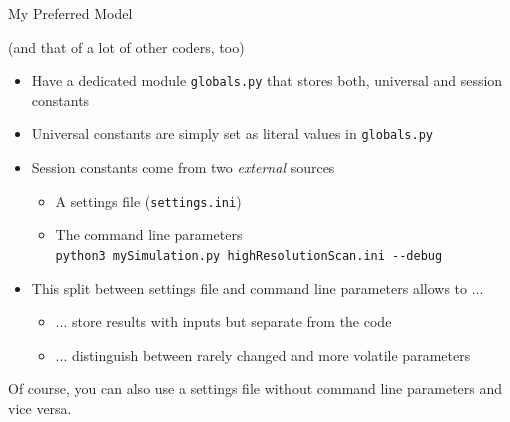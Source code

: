 \begin{frame}{My Preferred Model}
%
\begin{center}
\tiny
(and that of a lot of other coders, too)
\end{center}
%
\begin{itemize}
\item Have a dedicated module \texttt{globals.py} that stores both, universal and session constants
\item Universal constants are simply set as literal values in \texttt{globals.py}
\item Session constants come from two \emph{external} sources
	\begin{itemize}
	\item A settings file (\texttt{settings.ini})
	\item The command line parameters \\
		\texttt{python3 mySimulation.py highResolutionScan.ini -{}-debug}
	\end{itemize}
\item This split between settings file and command line parameters allows to ...
	\begin{itemize}
	\item ... store results with inputs but separate from the code
	\item ... distinguish between rarely changed and more volatile parameters
	\end{itemize}
\end{itemize}
%
\begin{hintbox}
\footnotesize
Of course, you can also use a settings file without command line parameters and vice versa.
\end{hintbox}
%
\end{frame}


